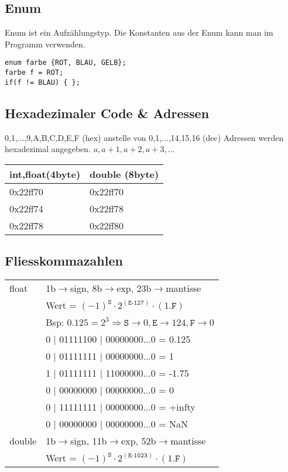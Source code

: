\subsection{Enum}
Enum ist ein Aufzählungstyp. Die Konstanten aus der Enum
kann man im Programm verwenden.
\begin{lstlisting}	
enum farbe {ROT, BLAU, GELB};
farbe f = ROT;
if(f != BLAU) { }; 
\end{lstlisting}

\subsection{Hexadezimaler Code \& Adressen}
0,1,...,9,A,B,C,D,E,F (hex) anstelle von 0,1,...,14,15,16 (dec)
Adressen werden hexadezimal angegeben. $a,a+1,a+2,a+3,...$

\begin{center}
	\begin{tabular}{ ll } 
		\hline
int,float(4byte) & double (8byte)\\
\hline
0x22ff70 & 0x22ff70\\
0x22ff74 & 0x22ff78\\
0x22ff78 & 0x22ff80\\
		\hline
	\end{tabular}
\end{center}

\subsection{Fliesskommazahlen}
\begin{center}
	\begin{tabular}{ ll } 
		float&1b$\rightarrow$sign, 8b$\rightarrow$exp, 23b$\rightarrow$mantisse\\
		&Wert = $(-1)^{\texttt{S}} \cdot 2^{(\texttt{E-127})} \cdot (1.\texttt{F})$\\
		&Bsp: $0.125 = 2^{3} \Rightarrow \texttt{S} \rightarrow 0, \texttt{E} \rightarrow 124, \texttt{F} \rightarrow 0$\\
		\hline
		 & 0 | 01111100 | 00000000...0 = 0.125\\
		 & 0 | 01111111 | 00000000...0 = 1\\
		 & 1 | 01111111 | 11000000...0 = -1.75\\
		 & 0 | 00000000 | 00000000...0 = 0\\
		 & 0 | 11111111 | 00000000...0 = +infty\\
		 & 0 | 00000000 | 00000000...0 = NaN\\
		\hline
		double& 1b$\rightarrow$sign, 11b$\rightarrow$exp, 52b$\rightarrow$mantisse\\
		& Wert = $(-1)^{\texttt{S}} \cdot 2^{(\texttt{E-1023})} \cdot (1.\texttt{F})$\\
	\end{tabular}
\end{center}















